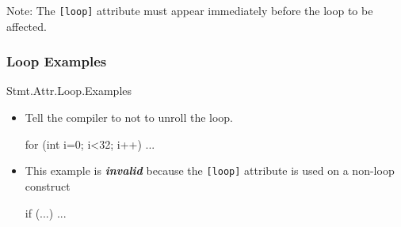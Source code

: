 Note:  The \texttt{[loop]} attribute  must appear immediately before the loop
 to be affected.
 
\subsubsection{Loop Examples}{Stmt.Attr.Loop.Examples}
\begin{itemize}
\item  Tell the compiler to not to unroll the loop.
\begin{HLSL}
[loop]
for (int i=0; i<32; i++) {
    ...
}
\end{HLSL}
\item This example is \textbf{\emph{invalid}} because the \texttt{[loop]} 
attribute is used on a non-loop construct
\begin{HLSL}
[loop]
if (...)
{
    ...
}
\end{HLSL}
\end{itemize}